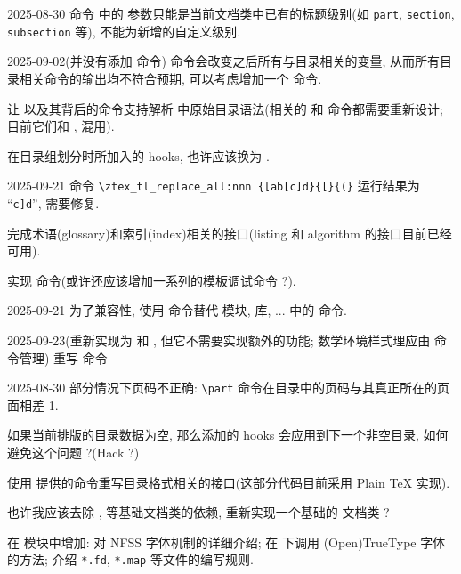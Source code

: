 \begin{todolist}
  \item [2025-08-30] 命令  中的  参数只能是当前文档类中已有的标题级别(如 \texttt{part}, \texttt{section}, \texttt{subsection} 等),%
        不能为新增的自定义级别.
  \item [2025-09-02(并没有添加 \cs{zlocaltocenable} 命令)]  命令会改变之后所有与目录相关的变量, 从而所有目录相关命令的输出均不符合预期, 
        可以考虑增加一个  命令.
  \item 让 \cmd{\zlocaltoc} 以及其背后的命令支持解析  中原始目录语法(相关的  和  命令都需要重新设计; 目前它们和 ,  混用).
  \item 在目录组划分时所加入的 hooks, 也许应该换为 \cmd{\UseHookWithArguments}.
  \item [2025-09-21] 命令 \verb|\ztex_tl_replace_all:nnn {[ab[c]d}{[}{(}| 运行结果为 ``\texttt{c]d}'', 需要修复.
  \item 完成术语(glossary)和索引(index)相关的接口(listing 和 algorithm 的接口目前已经可用).
  \item 实现  命令(或许还应该增加一系列的模板调试命令 ?).
  \item [2025-09-21] 为了兼容性, 使用  命令替代  模块,  库, ... 中的  命令.
  \item [2025-09-23(重新实现为 \cmd{\zthmenvnew} 和 \cmd{\zthmenvset}, 但它不需要实现额外的功能; 数学环境样式理应由 \cmd{\zthmstylenew} 命令管理)] 重写 \cmd{\zthmnew} 命令
  \item [2025-08-30] 部分情况下页码不正确: \verb|\part| 命令在目录中的页码与其真正所在的页面相差 1.
  \item 如果当前排版的目录数据为空, 那么添加的 hooks 会应用到下一个非空目录, 如何避免这个问题 ?(Hack  ?)
  \item 使用  提供的命令重写目录格式相关的接口(这部分代码目前采用 Plain \TeX{} 实现).
  \item 也许我应该去除 ,  等基础文档类的依赖, 重新实现一个基础的  文档类 ?
  \item 在  模块中增加: 对 NFSS 字体机制的详细介绍; 在  下调用 (Open)TrueType 字体的方法; 介绍 \verb|*.fd|, \verb|*.map| 等文件的编写规则.

\end{todolist}

